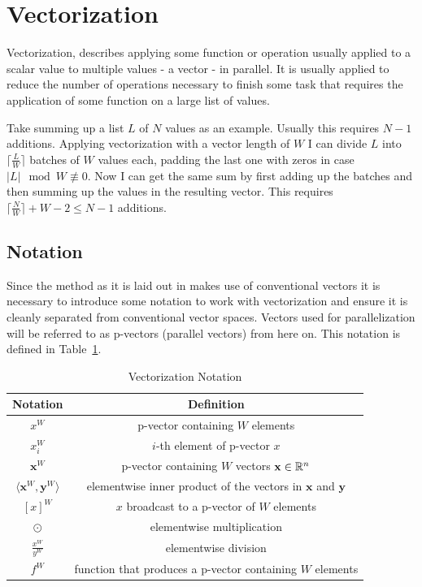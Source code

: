 \documentclass[a4paper, 11pt]{memoir}
\begin{document}
    \section{Vectorization}
    \label{sec:vectorization}
    Vectorization, describes applying some function or operation usually applied to a scalar value
    to multiple values - a vector - in parallel.
    It is usually applied to reduce the number of operations necessary to finish some task that
    requires the application of some function on a large list of values.

    Take summing up a list $L$ of $N$ values as an example. Usually this requires $N - 1$ additions.
    Applying vectorization with a vector length of $W$ I can divide $L$ into $\lceil \frac{L}{W} \rceil$
    batches of $W$ values each, padding the last one with zeros in case $|L| \mod W \not\equiv 0$. Now I
    can get the same sum by first adding up the batches and then summing up the values in the resulting
    vector. This requires $\lceil \frac{N}{W} \rceil + W - 2 \leq N - 1$ additions.

    \subsection{Notation}
    \label{sec:notation}
    Since the method as it is laid out in \cite{Rhodin:2015} makes use of conventional vectors it is
    necessary to introduce some notation to work with vectorization and ensure it is
    cleanly separated from conventional vector spaces. Vectors used for parallelization
    will be referred to as p-vectors (parallel vectors) from here on. This notation is
    defined in Table~\ref{tab:notation}.
    \begin{table}[b]
        \centering
        \begin{tabular}{|c|c|}
            \hline
            Notation & Definition \\
            \hline
            $x^W$ & p-vector containing $W$ elements\\
            $x^W_i$ & $i$-th element of p-vector $x$\\
            $\mathbf{x}^W$ & p-vector containing $W$ vectors $\mathbf{x} \in \mathbb{R}^n$\\
            $\langle \mathbf{x}^W, \mathbf{y}^W \rangle$ & elementwise inner product of the vectors in $\mathbf{x}$ and $\mathbf{y}$\\
            $[ x ]^W$ & $x$ broadcast to a p-vector of $W$ elements\\
            $\odot$ & elementwise multiplication\\
            $\frac{x^W}{y^W}$ & elementwise division\\
            $f^W$ & function that produces a p-vector containing $W$ elements\\\hline
        \end{tabular}
        \caption{Vectorization Notation}
        \label{tab:notation}
    \end{table}
\end{document}
